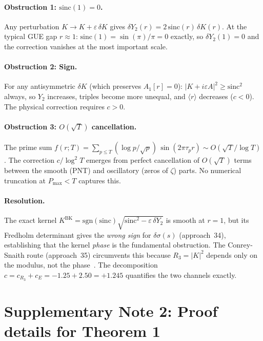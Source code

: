 \documentclass[10pt]{article}
\begin{document}
\paragraph{Obstruction 1: $\mathrm{sinc}(1) = 0$.}
Any perturbation $K \to K + \varepsilon\,\delta K$ gives
$\delta Y_2(r) = 2\,\mathrm{sinc}(r)\,\delta K(r)$.
At the typical GUE gap $r \approx 1$: $\mathrm{sinc}(1) = \sin(\pi)/\pi = 0$
exactly, so $\delta Y_2(1) = 0$ and the correction vanishes at the most
important scale.

\paragraph{Obstruction 2: Sign.}
For any antisymmetric $\delta K$ (which preserves $A_1[r] = 0$):
$|K + i\varepsilon A|^2 \geq \mathrm{sinc}^2$ always, so $Y_2$ increases,
triples become more unequal, and $\langle r\rangle$ decreases ($c < 0$).
The physical correction requires $c > 0$.

\paragraph{Obstruction 3: $O(\sqrt{T})$ cancellation.}
The prime sum $f(r; T) = \sum_{p \leq T} (\log p / \sqrt{p})\,\sin(2\pi\tau_p r)
\sim O(\sqrt{T}/\log T)$. The correction $c/\log^2 T$ emerges from perfect
cancellation of $O(\sqrt{T})$ terms between the smooth (PNT) and oscillatory
(zeros of $\zeta$) parts. No numerical truncation at $P_{\max} < T$ captures this.

\paragraph{Resolution.}
The exact kernel $K^{\mathrm{BK}} = \mathrm{sgn}(\mathrm{sinc})\sqrt{\mathrm{sinc}^2 - \varepsilon\,\delta Y_2}$
is smooth at $r = 1$, but its Fredholm determinant gives the \emph{wrong sign}
for $\delta\sigma(s)$ (approach~34), establishing that the kernel \emph{phase}
is the fundamental obstruction. The Conrey-Snaith route (approach~35) circumvents
this because $R_3 = |K|^2$ depends only on the modulus, not the phase~\cite{alarcon2026b}.
The decomposition $c = c_{R_3} + c_E = -1.25 + 2.50 = +1.245$ quantifies the
two channels exactly.


\section{Supplementary Note 2: Proof details for Theorem 1}
\end{document}
